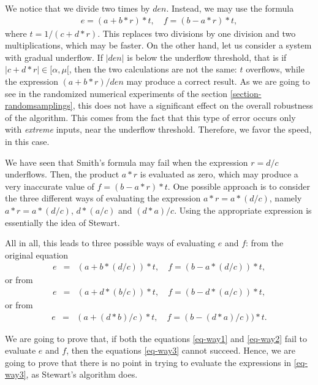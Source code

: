 \documentclass{paper}
\begin{document}
We notice that we divide two times by $den$. 
Instead, we may use the formula 
\begin{eqnarray}
\label{eq-way-smith}
    e = (a + b * r) * t, \quad
    f = (b - a * r) * t,
\end{eqnarray}
where $t=1/(c+d*r)$.
This replaces two divisions by one division and two multiplications, 
which may be faster. 
On the other hand, let us consider a system with gradual underflow. 
If $|den|$ is below the underflow threshold, that 
is if $|c+d*r|\in[\alpha,\mu[$, then the 
two calculations are not the same: $t$ overflows, 
while the expression $(a+b*r)/den$ may produce a correct result. 
As we are going to see in the randomized numerical experiments of the section 
\ref{section-randomsamplings}, this does not have a significant effect 
on the overall robustness of the algorithm. 
This comes from the fact that this type of error occurs 
only with \emph{extreme} inputs, near the underflow threshold.  
Therefore, we favor the speed, in this case.

We have seen that Smith's formula may fail when 
the expression $r = d/c$ underflows. 
Then, the product $a*r$ is evaluated as zero, which may 
produce a very inaccurate value of $f= (b - a * r) * t$.
One possible approach is to consider the three different ways of 
evaluating the expression $a*r = a * (d/c)$, namely 
$a*r=a*(d/c)$, $d*(a/c)$ and $(d*a)/c$. 
Using the appropriate expression is essentially the idea of 
Stewart. 

All in all, this leads to three possible ways of evaluating $e$ and $f$: from 
the original equation 
\begin{eqnarray}
\label{eq-way1}
            e &=& (a + b * (d/c)) * t, \quad
            f = (b - a * (d/c)) * t,
\end{eqnarray}
or from 
\begin{eqnarray}
\label{eq-way2}
            e &=& (a + d * (b/c)) * t, \quad
            f = (b - d * (a/c)) * t,
\end{eqnarray}
or from
\begin{eqnarray}
\label{eq-way3}
            e &=& (a + (d * b)/c) * t, \quad
            f = (b - (d * a)/c)) * t.
\end{eqnarray}

We are going to prove that, if both the equations \ref{eq-way1} 
and \ref{eq-way2} fail to evaluate $e$ and $f$, then 
the equations \ref{eq-way3} cannot succeed. 
Hence, we are going to prove that there is no point in trying 
to evaluate the expressions in \ref{eq-way3}, as 
Stewart's algorithm does.
\end{document}
